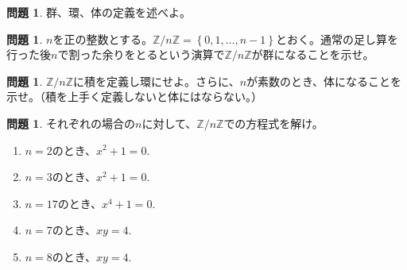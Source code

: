 \documentclass[uplatex]{jsarticle}
\theoremstyle{definition}
\numberwithin{equation}{section}
\newtheorem{prob}[section]{問題}
\newcommand{\Zn}{\mathbb{Z}/n\mathbb{Z}}
\begin{document}
\begin{prob}
  群、環、体の定義を述べよ。
\end{prob}

\begin{prob}
$n$を正の整数とする。$\Zn= \left\{ 0,1,\dots, n-1 \right\}$とおく。通常の足し算を行った後$n$で割った余りをとるという演算で$\Zn$が群になることを示せ。
\end{prob}

\begin{prob}
  $\Zn$に積を定義し環にせよ。さらに、$n$が素数のとき、体になることを示せ。（積を上手く定義しないと体にはならない。）
\end{prob}

\begin{prob}
  それぞれの場合の$n$に対して、$\Zn$での方程式を解け。
  \begin{enumerate}
    \item $n=2$のとき、$x^2 + 1 = 0$.
    \item $n=3$のとき、$x^2 + 1 = 0$.
    \item $n=17$のとき、$x^4 + 1 = 0$.
    \item $n=7$のとき、$x y = 4$.
    \item $n=8$のとき、$x y = 4$.
  \end{enumerate}
\end{prob}
\end{document}

